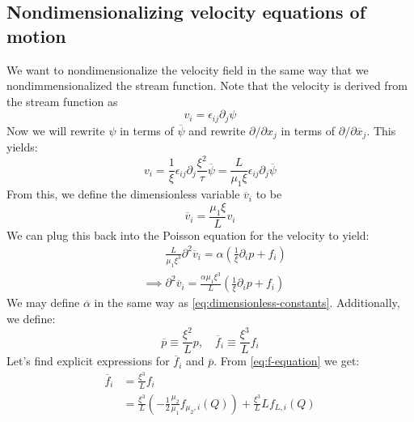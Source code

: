 \documentclass[reqno]{article}
\begin{document}
	\subsection{Nondimensionalizing velocity equations of motion}
	We want to nondimensionalize the velocity field in the same way that we nondimmensionalized the stream function.
	Note that the velocity is derived from the stream function as
	\begin{equation}
		v_i = \epsilon_{ij} \partial_j \psi
	\end{equation}
	Now we will rewrite $\psi$ in terms of $\overline{\psi}$ and rewrite $\partial/\partial x_j$ in terms of $\partial/\partial \overline{x}_j$. 
	This yields:
	\begin{equation}
		v_i 
		= \frac{1}{\xi} \epsilon_{ij} \partial_j \frac{\xi^2}{\tau} \overline{\psi}
		= \frac{L}{\mu_1 \xi} \epsilon_{ij} \partial_j \overline{\psi}
	\end{equation}
	From this, we define the dimensionless variable $\overline{v}_i$ to be
	\begin{equation}
		\overline{v}_i = \frac{\mu_1 \xi}{L} v_i
	\end{equation}
	We can plug this back into the Poisson equation for the velocity to yield:
	\begin{equation}
	\begin{split}
		&\qquad\frac{L}{\mu_1 \xi^3} \partial^2 \overline{v}_i
		= \alpha \left(
		\frac{1}{\xi} \partial_i p + f_i
		\right) \\
		&\implies
		\partial^2 \overline{v}_i
		= \frac{\alpha \mu_1 \xi^3}{L} \left(
		\frac{1}{\xi} \partial_i p
		+ f_i
		\right)
	\end{split}
	\end{equation}
	We may define $\overline{\alpha}$ in the same way as \eqref{eq:dimensionless-constants}. 
	Additionally, we define:
	\begin{equation}
		\overline{p} \equiv \frac{\xi^2}{L} p,
		\quad \overline{f}_i \equiv \frac{\xi^3}{L} f_i
	\end{equation}
	Let's find explicit expressions for $\overline{f}_i$ and $\overline{p}$.
	From \eqref{eq:f-equation} we get:
	\begin{equation}
	\begin{split}
		\overline{f}_i 
		&= \frac{\xi^3}{L} f_i \\
		&= \frac{\xi^3}{L} \left( 
		- \frac12 \frac{\mu_2}{\mu_1} f_{\mu_2, i} (Q)
		\right)
		+ \frac{\xi^3}{L} L f_{L, i}(Q)
	\end{split}
	\end{equation}
\end{document}
